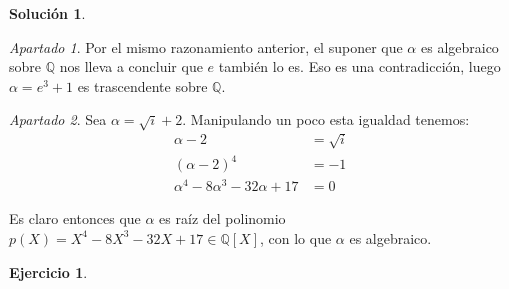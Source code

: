 \documentclass[a4paper, 11pt]{article}
\theoremstyle{definition}
\newtheorem{ejercicio}{Ejercicio}
\newtheorem*{solucion}{Solución}
\theoremstyle{remark}
\newtheorem{apartado}{Apartado}[ejercicio]
\begin{document}
\begin{solucion}
\begin{apartado}
          Por el mismo razonamiento anterior, el suponer que $\alpha$ es algebraico sobre $\mathbb{Q}$ nos lleva a concluir que $e$ también lo es. Eso es una contradicción, luego $\alpha = e^3+1$ es trascendente sobre $\mathbb{Q}$.
      \end{apartado}

      \begin{apartado}
          Sea $\alpha = \sqrt{i}+2$. Manipulando un poco esta igualdad tenemos:
          \begin{align*}
              \alpha-2 &= \sqrt{i} \\
              (\alpha-2)^4 &= -1 \\
              \alpha^4-8\alpha^3-32\alpha+17 &= 0
          \end{align*}

          Es claro entonces que $\alpha$ es raíz del polinomio $p(X) = X^4-8X^3-32X+17 \in \mathbb{Q}[X]$, con lo que $\alpha$ es algebraico.
      \end{apartado}
  \end{solucion}

  \begin{ejercicio}
  \end{ejercicio}
\end{document}
